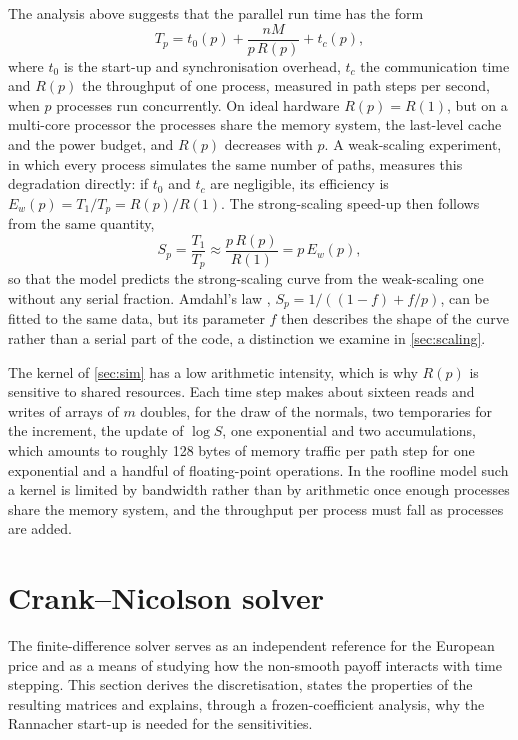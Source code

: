 \documentclass[11pt,a4paper]{article}
\begin{document}
The analysis above suggests that the parallel run time has the form
\begin{equation}\label{eq:perf}
T_p = t_0(p) + \frac{nM}{p\,R(p)} + t_c(p),
\end{equation}
where $t_0$ is the start-up and synchronisation overhead, $t_c$ the communication time and $R(p)$ the throughput of one process, measured in path steps per second, when $p$ processes run concurrently.
On ideal hardware $R(p) = R(1)$, but on a multi-core processor the processes share the memory system, the last-level cache and the power budget, and $R(p)$ decreases with $p$.
A weak-scaling experiment, in which every process simulates the same number of paths, measures this degradation directly: if $t_0$ and $t_c$ are negligible, its efficiency is $E_w(p) = T_1/T_p = R(p)/R(1)$.
The strong-scaling speed-up then follows from the same quantity,
\begin{equation}\label{eq:pred}
S_p = \frac{T_1}{T_p} \approx \frac{p\,R(p)}{R(1)} = p\,E_w(p),
\end{equation}
so that the model predicts the strong-scaling curve from the weak-scaling one without any serial fraction.
Amdahl's law \citep{amdahl1967}, $S_p = 1/((1-f)+f/p)$, can be fitted to the same data, but its parameter $f$ then describes the shape of the curve rather than a serial part of the code, a distinction we examine in \cref{sec:scaling}.

The kernel of \cref{sec:sim} has a low arithmetic intensity, which is why $R(p)$ is sensitive to shared resources.
Each time step makes about sixteen reads and writes of arrays of $m$ doubles, for the draw of the normals, two temporaries for the increment, the update of $\log S$, one exponential and two accumulations, which amounts to roughly 128 bytes of memory traffic per path step for one exponential and a handful of floating-point operations.
In the roofline model \citep{williams2009} such a kernel is limited by bandwidth rather than by arithmetic once enough processes share the memory system, and the throughput per process must fall as processes are added.

\section{Crank--Nicolson solver}\label{sec:cn}

The finite-difference solver serves as an independent reference for the European price and as a means of studying how the non-smooth payoff interacts with time stepping.
This section derives the discretisation, states the properties of the resulting matrices and explains, through a frozen-coefficient analysis, why the Rannacher start-up is needed for the sensitivities.
\end{document}
